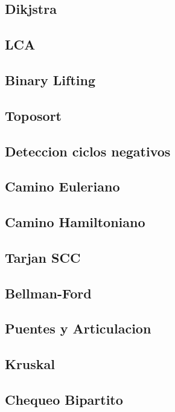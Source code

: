 \documentclass[a4paper,11pt,landscape,twocolumn]{article}
\begin{document}
\subsection{Dikjstra}

\subsection{LCA}

\subsection{Binary Lifting}

\subsection{Toposort}

\subsection{Deteccion ciclos negativos}

\subsection{Camino Euleriano}

\subsection{Camino Hamiltoniano}

\subsection{Tarjan SCC}

\subsection{Bellman-Ford}

\subsection{Puentes y Articulacion}

\subsection{Kruskal}

\subsection{Chequeo Bipartito}

\end{document}
